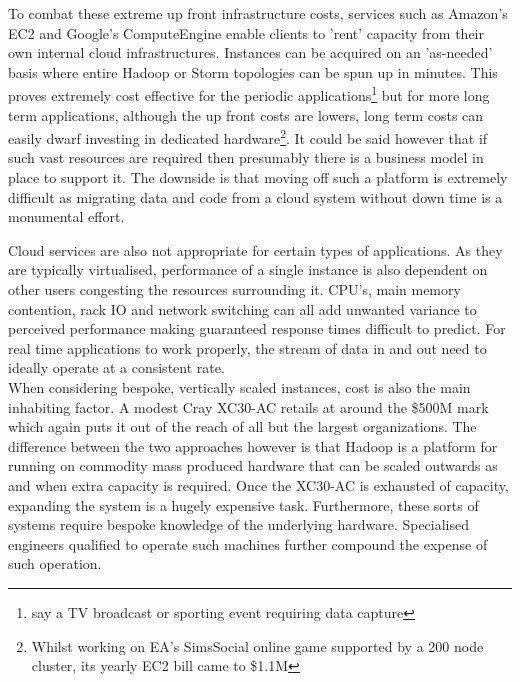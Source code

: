 \documentclass[a4paper,11pt]{scrreprt}
\begin{document}
To combat these extreme up front infrastructure costs, services such as Amazon's EC2 and Google's ComputeEngine enable clients to 'rent' capacity from their own internal cloud infrastructures. Instances can be acquired on an 'as-needed' basis where entire Hadoop or Storm topologies can be spun up in minutes. This proves extremely cost effective for the periodic applications\footnote{say a TV broadcast or sporting event requiring data capture} but for more long term applications, although the up front costs are lowers, long term costs can easily dwarf investing in dedicated hardware\footnote{Whilst working on EA's SimsSocial online game supported by a 200 node cluster, its yearly EC2 bill came to \$1.1M}. It could be said however that if such vast resources are required then presumably there is a business model in place to support it. The downside is that moving off such a platform is extremely difficult as migrating data and code from a cloud system without down time is a monumental effort.\

Cloud services are also not appropriate for certain types of applications. As they are typically virtualised, performance of a single instance is also dependent on other users congesting the resources surrounding it. CPU's, main memory contention, rack IO and network switching can all add unwanted variance to perceived performance making guaranteed response times difficult to predict. For real time applications to work properly, the stream of data in and out need to ideally operate at a consistent rate.\\

When considering bespoke, vertically scaled instances, cost is also the main inhabiting factor. A modest Cray XC30-AC retails at around the \$500M mark which again puts it out of the reach of all but the largest organizations. The difference between the two approaches however is that Hadoop is a platform for running on commodity mass produced hardware that can be scaled outwards as and when extra capacity is required. Once the XC30-AC is exhausted of capacity, expanding the system is a hugely expensive task. Furthermore, these sorts of systems require bespoke knowledge of the underlying hardware. Specialised engineers qualified to operate such machines further compound the expense of such operation. 
\end{document}
